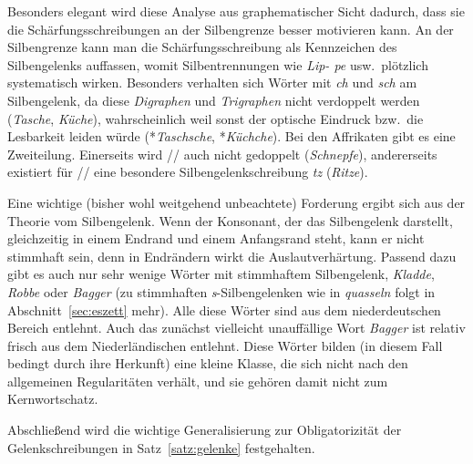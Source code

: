 
Besonders elegant wird diese Analyse aus graphematischer Sicht dadurch, dass sie die Schärfungsschreibungen an der Silbengrenze besser motivieren kann.
An der Silbengrenze kann man die Schärfungsschreibung als Kennzeichen des Silbengelenks auffassen, womit Silbentrennungen wie \textit{Lip- pe} usw.\ plötzlich systematisch wirken.
Besonders verhalten sich Wörter mit \textit{ch} und \textit{sch} am Silbengelenk, da diese \textit{Digraphen} und \textit{Trigraphen} nicht verdoppelt werden (\textit{Tasche}, \textit{Küche}), wahrscheinlich weil sonst der optische Eindruck bzw.\ die Lesbarkeit leiden würde (*\textit{Taschsche}, *\textit{Küchche}).
Bei den Affrikaten gibt es eine Zweiteilung.
Einerseits wird // auch nicht gedoppelt (\textit{Schnepfe}), andererseits existiert für // eine besondere Silbengelenkschreibung \textit{tz} (\textit{Ritze}).

Eine wichtige (bisher wohl weitgehend unbeachtete) Forderung ergibt sich aus der Theorie vom Silbengelenk.
Wenn der Konsonant, der das Silbengelenk darstellt, gleichzeitig in einem Endrand und einem Anfangsrand steht, kann er nicht stimmhaft sein, denn in Endrändern wirkt die Auslautverhärtung.
\label{abs:robbe}Passend dazu gibt es auch nur sehr wenige Wörter mit stimmhaftem Silbengelenk, \zB \textit{Kladde}, \textit{Robbe} oder \textit{Bagger} (zu stimmhaften \textit{s}-Silbengelenken wie in \textit{quasseln} folgt in Abschnitt~\ref{sec:eszett} mehr).
Alle diese Wörter sind aus dem niederdeutschen Bereich entlehnt.
Auch das zunächst vielleicht unauffällige Wort \textit{Bagger} ist relativ frisch aus dem Niederländischen entlehnt.
Diese Wörter bilden (in diesem Fall bedingt durch ihre Herkunft) eine kleine Klasse, die sich nicht nach den allgemeinen Regularitäten verhält, und sie gehören damit nicht zum Kernwortschatz.

Abschließend wird die wichtige Generalisierung zur Obligatorizität der Gelenkschreibungen in Satz~\ref{satz:gelenke} festgehalten.

